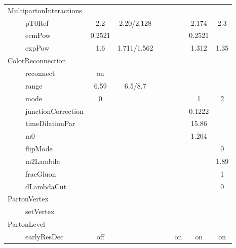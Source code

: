\begin{table}[!htp]
\begin{center}
{\begin{tabular}{ l|c|c|c|c|c|c|c}
MultipartonInteractions    &        &                 &                &                &        &           &      \\
~~~~~pT0Ref                & 2.2    & 2.20/2.128      &                &                &        & 2.174     & 2.3  \\
~~~~~ecmPow                & 0.2521 &                 &                &                &        & 0.2521    &      \\
~~~~~expPow                & 1.6    & 1.711/1.562     &                &                &        & 1.312     & 1.35 \\\hline
ColorReconnection          &        &                 &                &                &        &           &      \\
~~~~~reconnect             & on     &                 &                &                &        &           &      \\
~~~~~range                 & 6.59   & 6.5/8.7         &                &                &        &           &      \\
~~~~~mode                  & 0      &                 &                &                &        & 1         & 2    \\
~~~~~junctionCorrection    &        &                 &                &                &        & 0.1222    &      \\
~~~~~timeDilationPar       &        &                 &                &                &        & 15.86     &      \\
~~~~~m0                    &        &                 &                &                &        & 1.204     &      \\
~~~~~flipMode              &        &                 &                &                &        &           & 0    \\
~~~~~m2Lambda              &        &                 &                &                &        &           & 1.89 \\
~~~~~fracGluon             &        &                 &                &                &        &           & 1    \\
~~~~~dLambdaCut            &        &                 &                &                &        &           & 0    \\\hline
PartonVertex               &        &                 &                &                &        &           &      \\
~~~~~setVertex             &        &                 &                &                &        &           &      \\\hline
PartonLevel                &        &                 &                &                &        &           &      \\
~~~~~earlyResDec           & off    &                 &                &                & on     & on        & on   \\
\hline
\end{tabular}
}
\end{center}
\end{table}

